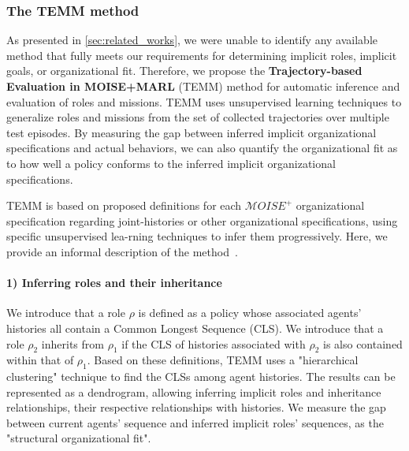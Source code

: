\documentclass[pdflatex,sn-mathphys-num]{sn-jnl}%
\theoremstyle{thmstyleone}%
\theoremstyle{thmstyletwo}%
\theoremstyle{thmstylethree}%
\begin{document}
\subsubsection{The TEMM method}
\label{sec:TEMM_algorithm}

As presented in \autoref{sec:related_works}, we were unable to identify any available method that fully meets our requirements for determining implicit roles, implicit goals, or organizational fit. Therefore, we propose the \textbf{Trajectory-based Evaluation in MOISE+MARL} (TEMM) method for automatic inference and evaluation of roles and missions.
%
TEMM uses unsupervised learning techniques to generalize roles and missions from the set of collected trajectories over multiple test episodes. By measuring the gap between inferred implicit organizational specifications and actual behaviors, we can also quantify the organizational fit as to how well a policy conforms to the inferred implicit organizational specifications.

TEMM is based on proposed definitions for each $\mathcal{M}OISE^+$ organizational specification regarding joint-histories or other organizational specifications, using specific unsupervised lea-rning techniques to infer them progressively. Here, we provide an informal description of the method~\hyperref[fn:github]{\footnotemark[1]}.
%

\paragraph{1) Inferring roles and their inheritance}

We introduce that a role $\rho$ is defined as a policy whose associated agents' histories all contain a Common Longest Sequence (CLS). We introduce that a role $\rho_2$ inherits from $\rho_1$ if the CLS of histories associated with $\rho_2$ is also contained within that of $\rho_1$.
Based on these definitions, TEMM uses a "hierarchical clustering" technique to find the CLSs among agent histories. The results can be represented as a dendrogram, allowing inferring implicit roles and inheritance relationships, their respective relationships with histories.
We measure the gap between current agents' sequence and inferred implicit roles' sequences, as the "structural organizational fit".
\end{document}
